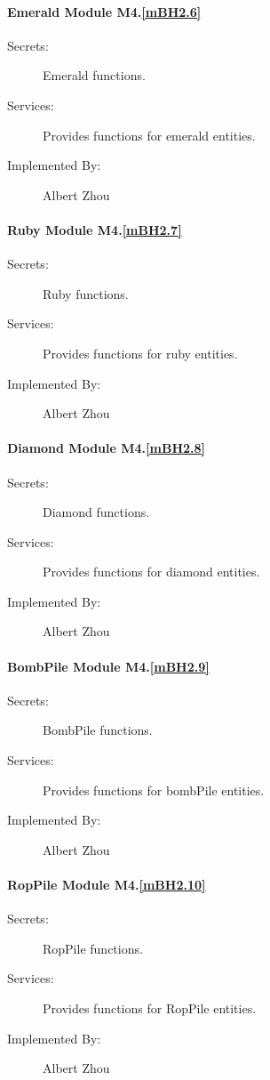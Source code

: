 \documentclass[12pt, titlepage]{article}
\begin{document}
{\paragraph{Emerald Module M4.\ref{mBH2.6}}
\begin{description}
\item[Secrets:] Emerald functions.
\item[Services:] Provides functions for emerald entities. 
\item[Implemented By:] Albert Zhou
\end{description}

\paragraph{Ruby Module M4.\ref{mBH2.7}}
\begin{description}
\item[Secrets:] Ruby functions.
\item[Services:] Provides functions for ruby entities. 
\item[Implemented By:] Albert Zhou
\end{description}

\paragraph{Diamond Module M4.\ref{mBH2.8}}
\begin{description}
\item[Secrets:] Diamond functions.
\item[Services:] Provides functions for diamond entities. 
\item[Implemented By:] Albert Zhou
\end{description}

\paragraph{BombPile Module M4.\ref{mBH2.9}}
\begin{description}
\item[Secrets:] BombPile functions.
\item[Services:] Provides functions for bombPile entities. 
\item[Implemented By:] Albert Zhou
\end{description}

\paragraph{RopPile Module M4.\ref{mBH2.10}}
\begin{description}
\item[Secrets:] RopPile functions.
\item[Services:] Provides functions for RopPile entities. 
\item[Implemented By:] Albert Zhou
\end{description}

}
\end{document}
